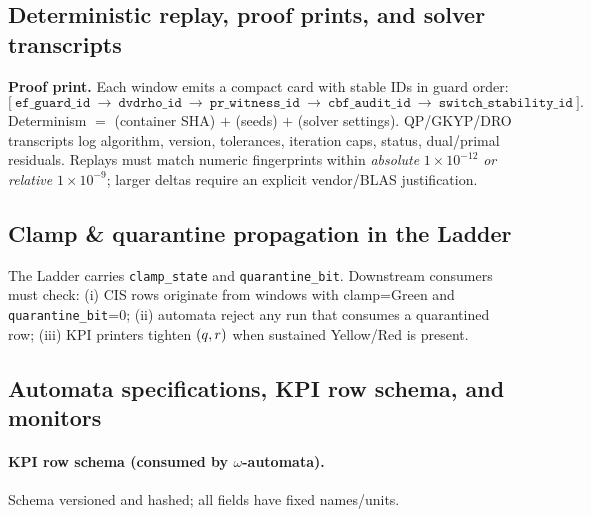 \subsection{Deterministic replay, proof prints, and solver transcripts}\label{subsec:det-replay}
\emph{}

\textbf{Proof print.} Each window emits a compact card with stable IDs in guard order:
\[
\big[\ \texttt{ef\_guard\_id}\ \rightarrow\ \texttt{dvdrho\_id}\ \rightarrow\ \texttt{pr\_witness\_id}\ \rightarrow\ \texttt{cbf\_audit\_id}\ \rightarrow\ \texttt{switch\_stability\_id}\ \big].
\]
Determinism \(=\) (container SHA) \(+\) (seeds) \(+\) (solver settings). QP/GKYP/DRO transcripts log algorithm, version, tolerances, iteration caps, status, dual/primal residuals. Replays must match numeric fingerprints within \emph{absolute} \(1\!\times\!10^{-12}\) \emph{or} \emph{relative} \(1\!\times\!10^{-9}\); larger deltas require an explicit vendor/BLAS justification. 

\subsection{Clamp \& quarantine propagation in the Ladder}\label{subsec:ladder-prop}
\emph{}

The Ladder carries \texttt{clamp\_state} and \texttt{quarantine\_bit}. Downstream consumers must check: (i) CIS rows originate from windows with clamp=Green and \texttt{quarantine\_bit}=0; (ii) automata reject any run that consumes a quarantined row; (iii) KPI printers tighten \((q,r)\) when sustained Yellow/Red is present. 

\subsection{Automata specifications, KPI row schema, and monitors}\label{subsec:automata}
\emph{}

\paragraph{KPI row schema (consumed by $\omega$-automata).}
Schema versioned and hashed; all fields have fixed names/units.

